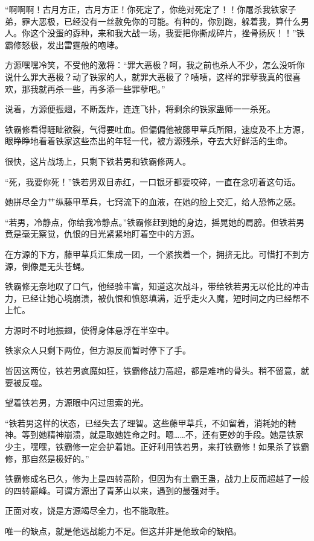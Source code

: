 \begin{this_body}
“啊啊啊！古月方正，古月方正！你死定了，你绝对死定了！！你屠杀我铁家子弟，罪大恶极，已经没有一丝赦免你的可能。有种的，你别跑，躲着我，算什么男人。你这个没蛋的孬种，来和我大战一场，我要把你撕成碎片，挫骨扬灰！！”铁霸修怒极，发出雷霆般的咆哮。

方源嘿嘿冷笑，不受他的激将：“罪大恶极？呵，我之前也杀人不少，怎么没听你说什么罪大恶极？动了铁家的人，就罪大恶极了？啧啧，这样的罪孽我真的很喜欢，那我就再杀一些，再多添一些罪孽吧。”

说着，方源便振翅，不断轰炸，连连飞扑，将剩余的铁家蛊师一一杀死。

铁霸修看得睚眦欲裂，气得要吐血。但偏偏他被藤甲草兵所阻，速度及不上方源，眼睁睁地看着铁家这些杰出的年轻一代，被方源残杀，夺去大好鲜活的生命。

很快，这片战场上，只剩下铁若男和铁霸修两人。

“死，我要你死！”铁若男双目赤红，一口银牙都要咬碎，一直在念叨着这句话。

她拼尽全力艹纵藤甲草兵，七窍流下的血液，在她的脸上交汇，给人恐怖之感。

“若男，冷静点，你给我冷静点。”铁霸修赶到她的身边，摇晃她的肩膀。但铁若男竟是毫无察觉，仇恨的目光紧紧地盯着空中的方源。

在方源的下方，藤甲草兵汇集成一团，一个紧挨着一个，拥挤无比。可惜打不到方源，倒像是无头苍蝇。

铁霸修无奈地叹了口气，他经验丰富，知道这次战斗，带给铁若男无以伦比的冲击力，已经让她心境崩溃，被仇恨和愤怒填满，近乎走火入魔，短时间之内已经帮不上忙。

方源时不时地振翅，使得身体悬浮在半空中。

铁家众人只剩下两位，但方源反而暂时停下了手。

皆因这两位，铁若男疯魔如狂，铁霸修战力高超，都是难啃的骨头。稍不留意，就要被反噬。

望着铁若男，方源眼中闪过思索的光。

“铁若男这样的状态，已经失去了理智。这些藤甲草兵，不如留着，消耗她的精神。等到她精神崩溃，就是取她姓命之时。嗯……不，还有更妙的手段。她是铁家少主，嘿嘿，铁霸修一定会护着她。正好利用铁若男，来打铁霸修！如果杀了铁霸修，那自然是极好的。”

铁霸修成名已久，修为上是四转高阶，但因为有土霸王蛊，战力上反而超越了一般的四转巅峰。可谓方源出了青茅山以来，遇到的最强对手。

正面对攻，饶是方源竭尽全力，也不能取胜。

唯一的缺点，就是他远战能力不足。但这并非是他致命的缺陷。


\end{this_body}

